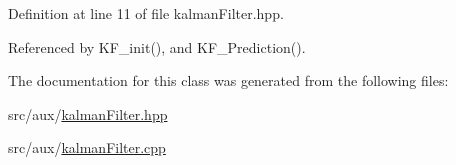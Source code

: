 Definition at line 11 of file kalman\+Filter.\+hpp.



Referenced by K\+F\+\_\+init(), and K\+F\+\_\+\+Prediction().



The documentation for this class was generated from the following files\+:\begin{DoxyCompactItemize}
\item 
src/aux/\hyperlink{kalman_filter_8hpp}{kalman\+Filter.\+hpp}\item 
src/aux/\hyperlink{kalman_filter_8cpp}{kalman\+Filter.\+cpp}\end{DoxyCompactItemize}
